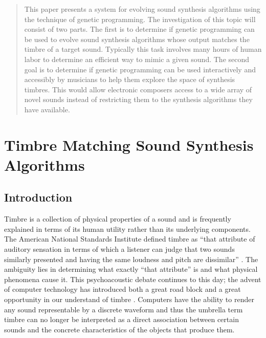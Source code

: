 \documentclass[12pt]{article}
\begin{document}
\maketitle

\begin{abstract}
This paper presents a system for evolving sound synthesis algorithms using the technique of genetic programming. The investigation of this topic will consist of two parts. The first is to determine if genetic programming can be used to evolve sound synthesis algorithms whose output matches the timbre of a target sound. Typically this task involves many hours of human labor to determine an efficient way to mimic a given sound. The second goal is to determine if genetic programming can be used interactively and accessibly by musicians to help them explore the space of synthesis timbres. This would allow electronic composers access to a wide array of novel sounds instead of restricting them to the synthesis algorithms they have available.
\end{abstract}

\section{Timbre Matching Sound Synthesis Algorithms}

\subsection{Introduction}\label{INTRO}
Timbre is a collection of physical properties of a sound and is frequently explained in terms of its human utility rather than its underlying components. The American National Standards Institute defined timbre as ``that attribute of auditory sensation in terms of which a listener can judge that two sounds similarly presented and having the same loudness and pitch are dissimilar'' \citep{american1960american}. The ambiguity lies in determining what exactly ``that attribute'' is and what physical phenomena cause it. This psychoacoustic debate continues to this day; the advent of computer technology has introduced both a great road block and a great opportunity in our understand of timbre \citep{erickson1975sound}. Computers have the ability to render any sound representable by a discrete waveform and thus the umbrella term timbre can no longer be interpreted as a direct association between certain sounds and the concrete characteristics of the objects that produce them.
\end{document}
